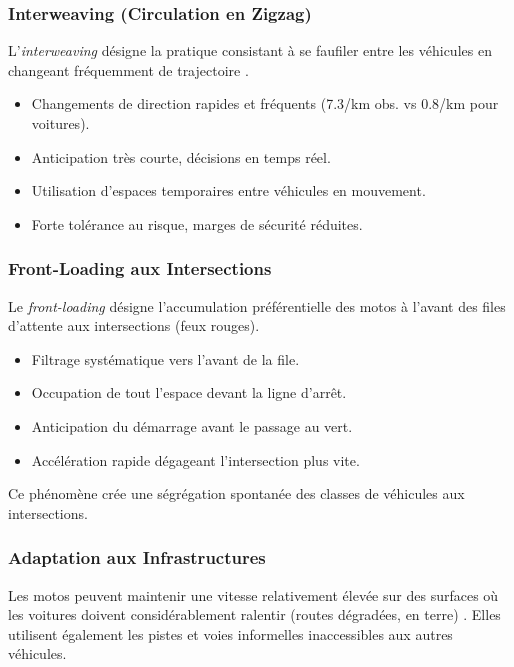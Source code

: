 \subsubsection{Interweaving (Circulation en Zigzag)}
\label{subsubsec:interweaving}
L'\textit{interweaving} désigne la pratique consistant à se faufiler entre les véhicules en changeant fréquemment de trajectoire \cite{kumar2018motorcycle}.
\begin{itemize}
    \item Changements de direction rapides et fréquents (7.3/km obs. vs 0.8/km pour voitures).
    \item Anticipation très courte, décisions en temps réel.
    \item Utilisation d'espaces temporaires entre véhicules en mouvement.
    \item Forte tolérance au risque, marges de sécurité réduites.
\end{itemize}

\subsubsection{Front-Loading aux Intersections}
\label{subsubsec:front_loading}
Le \textit{front-loading} désigne l'accumulation préférentielle des motos à l'avant des files d'attente aux intersections (feux rouges).
\begin{itemize}
    \item Filtrage systématique vers l'avant de la file.
    \item Occupation de tout l'espace devant la ligne d'arrêt.
    \item Anticipation du démarrage avant le passage au vert.
    \item Accélération rapide dégageant l'intersection plus vite.
\end{itemize}
Ce phénomène crée une ségrégation spontanée des classes de véhicules aux intersections.

\subsubsection{Adaptation aux Infrastructures}
\label{subsubsec:adaptation_infra}
Les motos peuvent maintenir une vitesse relativement élevée sur des surfaces où les voitures doivent considérablement ralentir (routes dégradées, en terre) \cite{karthik2019estimation}. Elles utilisent également les pistes et voies informelles inaccessibles aux autres véhicules.

